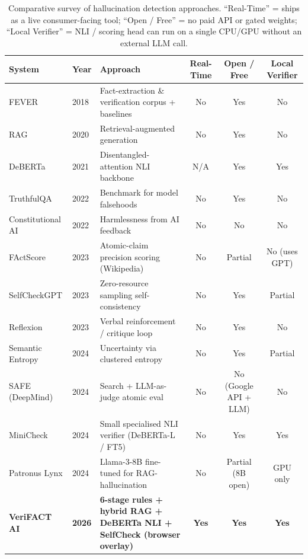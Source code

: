 \documentclass[12pt, a4paper, oneside]{report}
\begin{document}
\begin{table}[H]
\centering
\caption{Comparative survey of hallucination detection approaches. ``Real-Time'' = ships as a live consumer-facing tool; ``Open / Free'' = no paid API or gated weights; ``Local Verifier'' = NLI / scoring head can run on a single CPU/GPU without an external LLM call.}
\label{tab:literature}
\small
\begin{tabularx}{\textwidth}{l l X c c c}
\toprule
\textbf{System} & \textbf{Year} & \textbf{Approach} & \textbf{Real-Time} & \textbf{Open / Free} & \textbf{Local Verifier} \\
\midrule
FEVER \cite{thorne2018fever} & 2018 & Fact-extraction \& verification corpus + baselines & No & Yes & No \\
RAG \cite{lewis2020rag} & 2020 & Retrieval-augmented generation & No & Yes & No \\
DeBERTa \cite{he2021deberta} & 2021 & Disentangled-attention NLI backbone & N/A & Yes & Yes \\
TruthfulQA \cite{lin2022truthfulqa} & 2022 & Benchmark for model falsehoods & No & Yes & No \\
Constitutional AI \cite{bai2022constitutional} & 2022 & Harmlessness from AI feedback & No & No & No \\
FActScore \cite{min2023factscore} & 2023 & Atomic-claim precision scoring (Wikipedia) & No & Partial & No (uses GPT) \\
SelfCheckGPT \cite{manakul2023selfcheck} & 2023 & Zero-resource sampling self-consistency & No & Yes & Partial \\
Reflexion \cite{shinn2023reflexion} & 2023 & Verbal reinforcement / critique loop & No & Yes & No \\
Semantic Entropy \cite{kuhn2024entropy} & 2024 & Uncertainty via clustered entropy & No & Yes & Partial \\
SAFE (DeepMind) \cite{wei2024safe} & 2024 & Search + LLM-as-judge atomic eval & No & No (Google API + LLM) & No \\
MiniCheck \cite{tang2024minicheck} & 2024 & Small specialised NLI verifier (DeBERTa-L / FT5) & No & Yes & Yes \\
Patronus Lynx \cite{patronus2024lynx} & 2024 & Llama-3-8B fine-tuned for RAG-hallucination & No & Partial (8B open) & GPU only \\
\textbf{VeriFACT AI} & \textbf{2026} & \textbf{6-stage rules + hybrid RAG + DeBERTa NLI + SelfCheck (browser overlay)} & \textbf{Yes} & \textbf{Yes} & \textbf{Yes} \\
\bottomrule
\end{tabularx}
\end{table}
\end{document}
